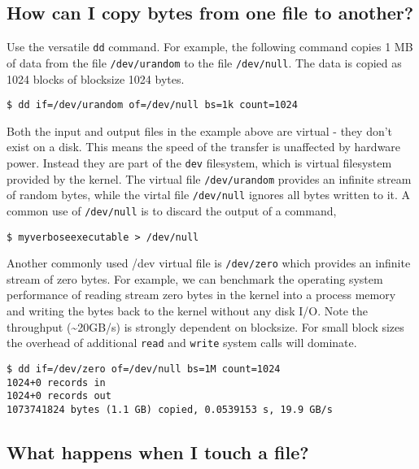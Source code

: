 \subsection{How can I copy bytes from one file to
another?}\label{how-can-i-copy-bytes-from-one-file-to-another}

Use the versatile \texttt{dd} command. For example, the following
command copies 1 MB of data from the file \texttt{/dev/urandom} to the
file \texttt{/dev/null}. The data is copied as 1024 blocks of blocksize
1024 bytes.

\begin{verbatim}
$ dd if=/dev/urandom of=/dev/null bs=1k count=1024
\end{verbatim}

Both the input and output files in the example above are virtual - they
don't exist on a disk. This means the speed of the transfer is
unaffected by hardware power. Instead they are part of the \texttt{dev}
filesystem, which is virtual filesystem provided by the kernel. The
virtual file \texttt{/dev/urandom} provides an infinite stream of random
bytes, while the virtal file \texttt{/dev/null} ignores all bytes
written to it. A common use of \texttt{/dev/null} is to discard the
output of a command,

\begin{verbatim}
$ myverboseexecutable > /dev/null
\end{verbatim}

Another commonly used /dev virtual file is \texttt{/dev/zero} which
provides an infinite stream of zero bytes. For example, we can benchmark
the operating system performance of reading stream zero bytes in the
kernel into a process memory and writing the bytes back to the kernel
without any disk I/O. Note the throughput (\textasciitilde{}20GB/s) is
strongly dependent on blocksize. For small block sizes the overhead of
additional \texttt{read} and \texttt{write} system calls will dominate.

\begin{verbatim}
$ dd if=/dev/zero of=/dev/null bs=1M count=1024
1024+0 records in
1024+0 records out
1073741824 bytes (1.1 GB) copied, 0.0539153 s, 19.9 GB/s
\end{verbatim}

\subsection{What happens when I touch a
file?}\label{what-happens-when-i-touch-a-file}

